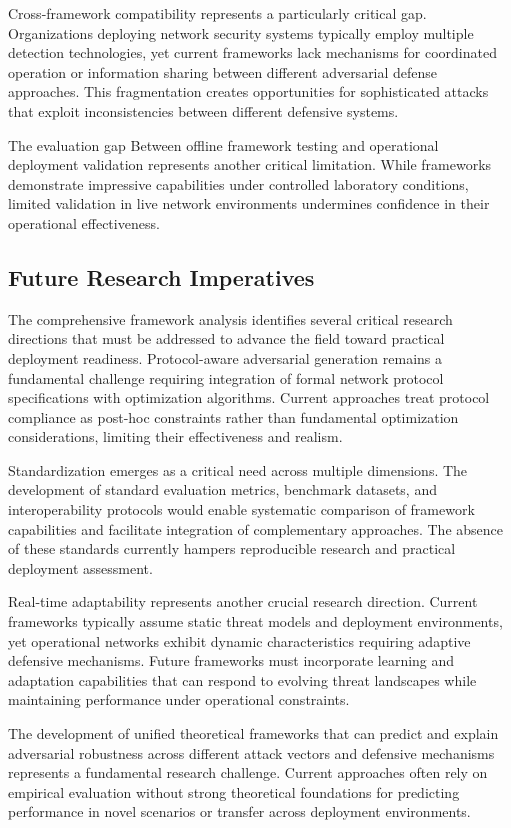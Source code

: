 Cross-framework compatibility represents a particularly critical gap. Organizations deploying network security systems typically employ multiple detection technologies, yet current frameworks lack mechanisms for coordinated operation or information sharing between different adversarial defense approaches. This fragmentation creates opportunities for sophisticated attacks that exploit inconsistencies between different defensive systems.

The evaluation gap Between offline framework testing and operational deployment validation represents another critical limitation. While frameworks demonstrate impressive capabilities under controlled laboratory conditions, limited validation in live network environments undermines confidence in their operational effectiveness.

\subsection{Future Research Imperatives}

The comprehensive framework analysis identifies several critical research directions that must be addressed to advance the field toward practical deployment readiness. Protocol-aware adversarial generation remains a fundamental challenge requiring integration of formal network protocol specifications with optimization algorithms. Current approaches treat protocol compliance as post-hoc constraints rather than fundamental optimization considerations, limiting their effectiveness and realism.

Standardization emerges as a critical need across multiple dimensions. The development of standard evaluation metrics, benchmark datasets, and interoperability protocols would enable systematic comparison of framework capabilities and facilitate integration of complementary approaches. The absence of these standards currently hampers reproducible research and practical deployment assessment.

Real-time adaptability represents another crucial research direction. Current frameworks typically assume static threat models and deployment environments, yet operational networks exhibit dynamic characteristics requiring adaptive defensive mechanisms. Future frameworks must incorporate learning and adaptation capabilities that can respond to evolving threat landscapes while maintaining performance under operational constraints.

The development of unified theoretical frameworks that can predict and explain adversarial robustness across different attack vectors and defensive mechanisms represents a fundamental research challenge. Current approaches often rely on empirical evaluation without strong theoretical foundations for predicting performance in novel scenarios or transfer across deployment environments.

